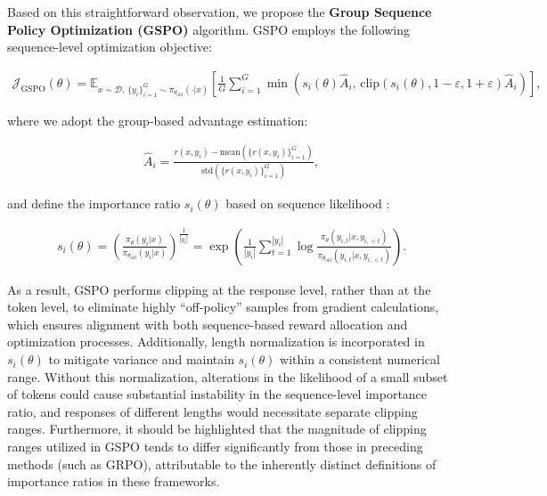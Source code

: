Based on this straightforward observation, we propose the \textbf{Group Sequence Policy Optimization (GSPO)} algorithm. GSPO employs the following sequence-level optimization objective:

\begin{align}
\mathcal{J}_\text{GSPO} (\theta) =
\mathbb{E}_{ x \sim \mathcal{D},\, \{y_i\}_{i=1}^G \sim \pi_{\theta_\text{old}}( \cdot | x) }
\left[ 
\frac{1}{G} \sum_{i=1}^{G}
\min \left( s_{i}(\theta)  \widehat{A}_{i},  \, \mathrm{clip} \left( s_{i}(\theta), 1 - {\varepsilon}, 1 + {\varepsilon} \right) \widehat{A}_{i} \right) 
\right],
\label{equ:gspo}
\end{align}

where we adopt the group-based advantage estimation:

\begin{align}
\widehat{A}_{i} = \frac{r(x, y_i) - \mathrm{mean} \left( \{ r(x, y_i) \}_{i=1}^G \right) }{ \mathrm{std} \left( \{ r(x, y_i) \}_{i=1}^G \right) },
\end{align}

and define the importance ratio $s_{i}(\theta)$ based on sequence likelihood \citep{click}:

\begin{align}
s_{i}(\theta) = \left( \frac{ \pi_{\theta} (y_i | x) }{ \pi_{\theta_\text{old}} (y_i | x)} \right)^{\frac{1}{|y_i|}}
=
\exp \left( \frac{1}{|y_i|} \sum_{t=1}^{|y_i|} \log \frac{ \pi_{\theta} (y_{i,t} | x, y_{i,<t}) }{ \pi_{\theta_\text{old}} (y_{i,t} | x,y_{i,<t})} \right).
\end{align}

As a result, GSPO performs clipping at the response level, rather than at the token level, to eliminate highly ``off-policy'' samples from gradient calculations, which ensures alignment with both sequence-based reward allocation and optimization processes. Additionally, length normalization is incorporated in $s_{i}(\theta)$ to mitigate variance and maintain $s_{i}(\theta)$ within a consistent numerical range. Without this normalization, alterations in the likelihood of a small subset of tokens could cause substantial instability in the sequence-level importance ratio, and responses of different lengths would necessitate separate clipping ranges. Furthermore, it should be highlighted that the magnitude of clipping ranges utilized in GSPO tends to differ significantly from those in preceding methods (such as GRPO), attributable to the inherently distinct definitions of importance ratios in these frameworks.

